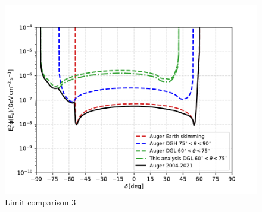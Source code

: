 \begin{figure}[t!]
  \centering
  \includegraphics[width=14.5cm]{thesis_figures/PointLimits/Point_comp_combined_3.pdf}
  \caption{Limit comparison 3}
  \label{fig:Dec_limit_comb3}
\end{figure}



